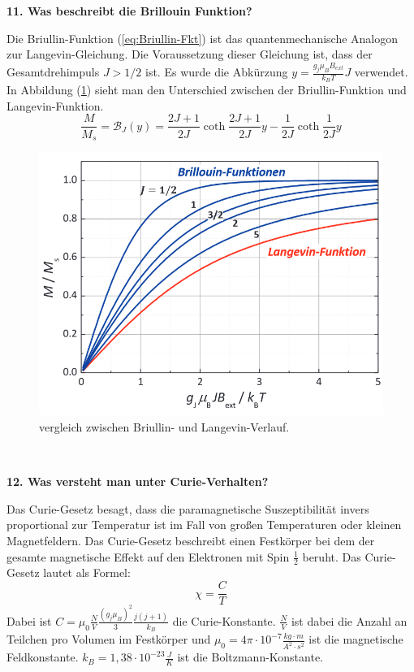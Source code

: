 \noindent\textbf{11. Was beschreibt die Brillouin Funktion?}\\
\begin{addmargin}[25pt]{0pt}
Die Briullin-Funktion (\ref{eq:Briullin-Fkt}) ist das quantenmechanische Analogon zur Langevin-Gleichung. Die Voraussetzung dieser Gleichung ist, dass der Gesamtdrehimpuls $J>1/2$ ist. Es wurde die Abkürzung $y=\frac{g_{j}\mu_{B}B_{ext}}{k_{B}T}J$ verwendet. In Abbildung (\ref{fig:Briullin-Verlauf}) sieht man den Unterschied zwischen der Briullin-Funktion und Langevin-Funktion.  
\begin{equation}
    \frac{M}{M_{s}} = \mathcal{B}_{J}(y) = \frac{2J+1}{2J}\coth{\frac{2J+1}{2J}y} -\frac{1}{2J} \coth{\frac{1}{2J}y}
    \label{eq:Briullin-Fkt}
\end{equation}
\begin{figure}
    \centering
    \includegraphics[scale=0.5]{images/KM2/Briullin-Verlauf.png}
    \caption{vergleich zwischen Briullin- und Langevin-Verlauf.}
    \label{fig:Briullin-Verlauf}
\end{figure}\\
\end{addmargin}

\noindent\textbf{12. Was versteht man unter Curie-Verhalten?}\\
\begin{addmargin}[25pt]{0pt}
Das Curie-Gesetz besagt, dass die paramagnetische Suszeptibilität invers proportional zur Temperatur ist im Fall von großen Temperaturen oder kleinen Magnetfeldern. Das Curie-Gesetz beschreibt einen Festkörper bei dem der gesamte magnetische Effekt auf den Elektronen mit Spin $\frac{1}{2}$ beruht. Das Curie-Gesetz lautet als Formel:
\begin{equation}\label{eq:Curie-Gesetz}
    \chi = \frac{C}{T}
\end{equation}
Dabei ist $C = \mu_0\frac{N}{V}\frac{(g_j\mu_B)^2}{3}\frac{j(j+1)}{k_B}$ die Curie-Konstante. $\frac{N}{V}$ ist dabei die Anzahl an Teilchen pro Volumen im Festkörper und $\mu_0 = 4\pi\cdot 10^{-7} \frac{\si{kg}\cdot \si{m}}{\si{A}^2\cdot \si{s}^2}$ ist die magnetische Feldkonstante. $k_B = 1,38\cdot 10^{-23} \frac{\si{J}}{\si{K}}$ ist die Boltzmann-Konstante.\\
\end{addmargin}

